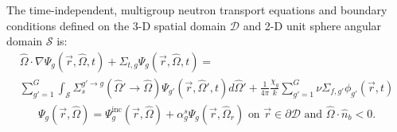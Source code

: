 \documentclass[letterpaper]{mc2025}
\begin{document}
The time-independent, multigroup neutron transport equations and boundary conditions defined on the
3-D spatial domain $\mathcal{D}$ and 2-D unit sphere angular domain $\mathcal{S}$ is:
%
\begin{multline}
  \hat{\Omega}\cdot\nabla\Psi_g(\vec{r},\hat{\Omega},t) + \Sigma_{t,g}
  \Psi_g(\vec{r},\hat{\Omega},t) = \\
  \sum^G_{g'=1}\int_\mathcal{S} \Sigma_s^{g'\rightarrow g}(\hat{\Omega}'\rightarrow\hat{\Omega})
  \Psi_{g'}(\vec{r},\hat{\Omega}',t)d\hat{\Omega}'
  + \frac{1}{4\pi}\frac{\chi_{g}}{k}\sum^G_{g'=1} \nu\Sigma_{f,g'} \phi_{g'}(\vec{r},t)
  \label{eq:mg-nte}
\end{multline}
%
\begin{gather}
  \Psi_g(\vec{r},\hat{\Omega}) = \Psi^\text{inc}_g(\vec{r},\hat{\Omega}) +
  \alpha^s_g\Psi_g(\vec{r},\hat{\Omega}_r)
  \mbox{ on } \vec{r} \in \partial\mathcal{D} \mbox{ and } \hat{\Omega}\cdot\hat{n}_b < 0.
  \label{eq:mg-nte-bc}
\end{gather}
%
\end{document}

